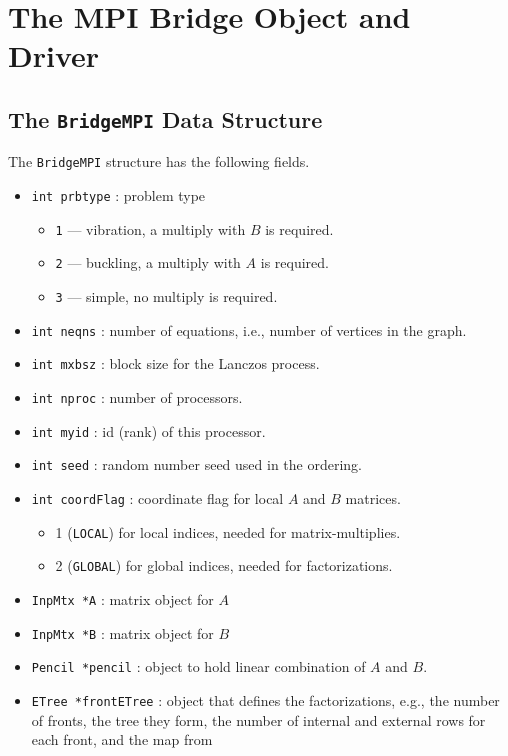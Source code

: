 \chapter{The MPI Bridge Object and Driver}
\label{chapter:MPI}
\par
\section{The \texttt{BridgeMPI} Data Structure}
\label{section:BridgeMPI:dataStructure}
\par
The {\tt BridgeMPI} structure has the following fields.
\begin{itemize}
%
\item
{\tt int prbtype} : problem type
\begin{itemize}
\item {\tt 1} --- vibration, a multiply with $B$ is required.
\item {\tt 2} --- buckling, a multiply with $A$ is required.
\item {\tt 3} --- simple, no multiply is required.
\end{itemize}
\item
{\tt int neqns} : number of equations, 
i.e., number of vertices in the graph.
\item
{\tt int mxbsz} : block size for the Lanczos process.
\item
{\tt int nproc} : number of processors.
\item
{\tt int myid} : id (rank) of this processor.
\item
{\tt int seed} : random number seed used in the ordering.
\item
{\tt int coordFlag} : coordinate flag for local $A$ and $B$ matrices.
\begin{itemize}
\item 1 ({\tt LOCAL}) for local indices, needed for matrix-multiplies.
\item 2 ({\tt GLOBAL}) for global indices, needed for factorizations.
\end{itemize}
\item
{\tt InpMtx *A} : matrix object for $A$
\item
{\tt InpMtx *B} : matrix object for $B$
\item
{\tt Pencil *pencil} : object to hold linear combination of $A$ and $B$.
\item
{\tt ETree *frontETree} : object that defines the factorizations,
e.g., the number of fronts, the tree they form, the number of
internal and external rows for each front, and the map from

\end{itemize}
